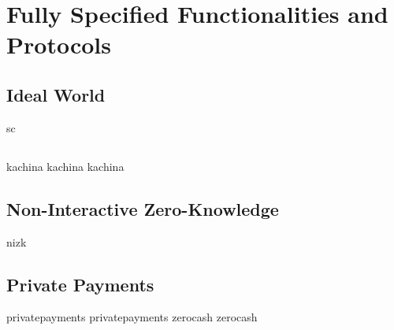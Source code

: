 \section{Fully Specified Functionalities and Protocols}
\label{sec:fullfuncts}

\subsection{Ideal World}
\label{sec:fullfsc}
{sc}
\subsection{\kachina}
\label{sec:fullkachina}
{kachina}
{kachina}
{kachina}
\subsection{Non-Interactive Zero-Knowledge}
\label{sec:fnizk}
{nizk}
\subsection{Private Payments}
\label{sec:fullpp}
{privatepayments}
{privatepayments}
{zerocash}
{zerocash}

